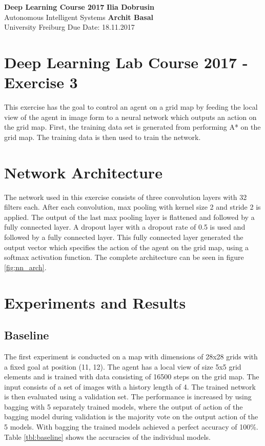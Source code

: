\documentclass[a4paper, 11pt]{article}
\begin{document}
\noindent
\large\textbf{Deep Learning Course 2017} \hfill \textbf{Ilia Dobrusin} \\
 Autonomous Intelligent Systems \hfill \textbf{Archit Basal} \\
 University Freiburg \hfill Due Date: 18.11.2017

\section*{Deep Learning Lab Course 2017 - Exercise 3}
This exercise has the goal to control an agent on a grid map by feeding the local view of the agent in image form to a neural network which outputs an action on the grid map. First, the training data set is generated from performing A* on the grid map. The training data is then used to train the network.


\section*{Network Architecture}
The network used in this exercise consists of three convolution layers with 32 filters each. After each convolution, max pooling with kernel size 2 and stride 2 is applied. The output of the last max pooling layer is flattened and followed by a fully connected layer. A dropout layer with a dropout rate of 0.5 is used and followed by a fully connected layer. This fully connected layer generated the output vector which specifies the action of the agent on the grid map, using a softmax activation function. The complete architecture can be seen in figure \ref{fig:nn_arch}.

\section*{Experiments and Results}
\subsection*{Baseline}
The first experiment is conducted on a map with dimensions of 28x28 grids with a fixed goal at position (11, 12). The agent has a local view of size 5x5 grid elements and is trained with data consisting of 16500 steps on the grid map. The input consists of a set of images with a history length of 4. The trained network is then evaluated using a validation set. The performance is increased by using bagging with 5 separately trained models, where the output of action of the bagging model during validation is the majority vote on the output action of the 5 models. With bagging the trained models achieved a perfect accuracy of 100\%. Table \ref{tbl:baseline} shows the accuracies of the individual models.
\end{document}
